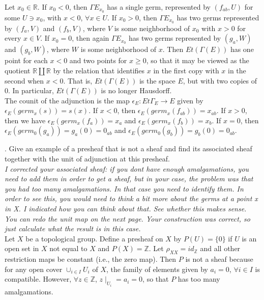 Let $x_0 \in \mathbb{R}$. If $x_0 <0$, then $\Gamma E_{x_0}$ has a single germ, represented by $(f_{ab}, U)$ for some $U \ni x_0$, with $x < 0$, $\forall x \in U$. If $x_0 >0$, then $\Gamma E_{x_0}$ has two germs represented by $(f_a,V)$ and $(f_b,V)$, where $V$ is some neighborhood of $x_0$ with $x>0$ for every $x \in V$. If $x_0=0$, then again $\Gamma E_{x_0}$ has two germs represented by $(g_a, W)$ and $(g_b,W)$, where $W$ is some neighborhood of $x$. Then $Et(\Gamma (E))$ has one point for each $x < 0$ and two points for $x \geq 0$, so that it may be viewed as the quotient $\mathbb{R} \coprod\mathbb{R}$ by the relation that identifies $x$ in the first copy with $x$ in the second when $x < 0$. That is, $Et(\Gamma(E))$ is the space $E$, but with two copies of $0$. In particular, $Et(\Gamma(E))$ is no longer Hausdorff.\\

The counit of the adjunction is the map $\epsilon_E: Et \Gamma_E \rightarrow E$ given by $\epsilon_E(germ_x(s))=s(x)$. If $x <0$, then $\epsilon_E(germ_x(f_{ab}))=x_{ab}$. If $x>0$, then we have $\epsilon_E(germ_x(f_a))=x_a$ and $\epsilon_E(germ_x(f_b))=x_b$. If $x=0$, then $\epsilon_E(germ_0(g_a))=g_a(0)=0_{ab}$ and $\epsilon_E(germ_0(g_b))=g_b(0)=0_{ab}$.


.  Give an example of a presheaf that is not a sheaf and find its associated sheaf together with the unit of adjunction at this presheaf.\\


\textit{I corrected your associated sheaf: if you dont have enough amalgamations, you need to add them in order to get a sheaf, but in your case, the problem was that you had too many amalgamations. In that case you need to identify them. In order to see this, you would need to think a bit more about the germs at a point x in X. I indicated how you can think about that. See whether this makes sense. You can redo the unit map on the next page. Your construction was correct, so just calculate what the result is in this case.}\\


Let $X$ be a topological group. Define a presheaf on $X$ by $P(U)=\{0\}$ if $U$ is an open set in $X$ not equal to $X$ and $P(X) = \mathbb{Z}$. Let $\rho_{XX} = id_\mathbb{Z}$ and all other restriction maps be constant (i.e., the zero map). Then $P$ is not a sheaf because for any open cover $\cup_{i \in I} U_i$ of $X$, the family of elements given by $a_i =0$, $\forall i \in I$ is compatible. However, $\forall z \in \mathbb{Z}$, $z \mid_{U_i} = a_i =0$, so that $P$ has too many amalgamations.\\

